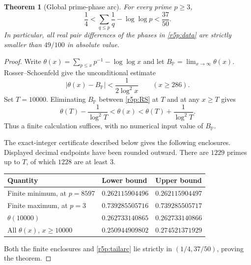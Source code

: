 \documentclass[11pt,a4paper]{article}
\newtheorem{theorem}{Theorem}[section]
\theoremstyle{definition}\newtheorem{definition}[theorem]{Definition}
\theoremstyle{remark}\newtheorem{remark}[theorem]{Remark}
\numberwithin{equation}{section}
\begin{document}
\begin{theorem}[Global prime-phase arc]\label{r5p:arc}
For every prime $p\geq3$,
\begin{equation}\label{r5p:arcinterval}
 \frac14<\sum_{q\leq p}\frac1q-\log\log p<\frac{37}{50}.
\end{equation}
In particular, all real pair differences of the phases in
\eqref{r5p:data} are strictly smaller than $49/100$ in absolute
value.
\end{theorem}

\begin{proof}
Write $\theta(x)=\sum_{p\leq x}p^{-1}-\log\log x$ and let
$B_{\mathbb P}=\lim_{x\to\infty}\theta(x)$.
Rosser--Schoenfeld \cite[Thm.~5, eqs.~(3.17)--(3.18)]{RosserSchoenfeld}
give the unconditional estimate
\begin{equation}\label{r5p:RS}
 |\theta(x)-B_{\mathbb P}|<\frac1{2\log^2x}
 \qquad(x\geq286).
\end{equation}
Set $T=10000$.  Eliminating $B_{\mathbb P}$ between
\eqref{r5p:RS} at $T$ and at any $x\geq T$ gives
\begin{equation}\label{r5p:tailarc}
 \theta(T)-\frac1{\log^2T}
 <\theta(x)<
 \theta(T)+\frac1{\log^2T}.
\end{equation}
Thus a finite calculation suffices, with no numerical input value
of $B_{\mathbb P}$.

The exact-integer certificate described below gives the following
enclosures.  Displayed decimal endpoints have been rounded outward.
There are $1229$ primes up to $T$, of which $1228$ are at least $3$.
\begin{center}
\begin{tabular}{@{}lll@{}}
\hline
Quantity & Lower bound & Upper bound\\
\hline
Finite minimum, at $p=8597$ & $0.262115904496$ & $0.262115904497$\\
Finite maximum, at $p=3$ & $0.739285505716$ & $0.739285505717$\\
$\theta(10000)$ & $0.262733140865$ & $0.262733140866$\\
All $\theta(x)$, $x\geq10000$ & $0.250944909802$ & $0.274521371929$\\
\hline
\end{tabular}
\end{center}
Both the finite enclosures and \eqref{r5p:tailarc} lie strictly in
$(1/4,37/50)$, proving the theorem.


\end{proof}
\end{document}
